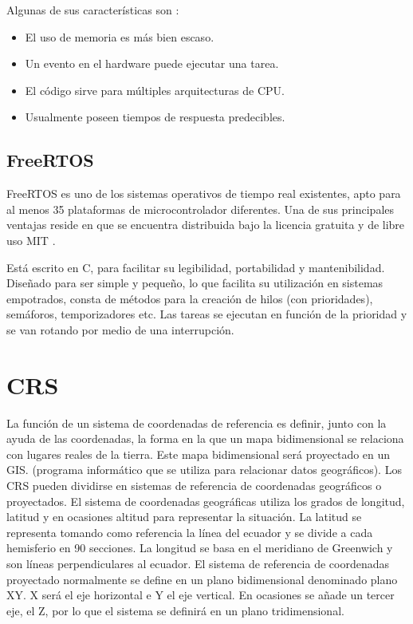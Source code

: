 Algunas de sus características son \cite{tiemporeal_c}:
\begin{itemize}
\tightlist
\item
	El uso de memoria es más bien escaso.
\item
	Un evento en el hardware puede ejecutar una tarea.
\item
	El código sirve para múltiples arquitecturas de CPU.
\item
	Usualmente poseen tiempos de respuesta predecibles.
\end{itemize}

\subsection{FreeRTOS}
FreeRTOS \cite{FreeRTOS} es uno de los sistemas operativos de tiempo real existentes, apto para al menos 35 plataformas de microcontrolador diferentes. Una de sus principales ventajas reside en que se encuentra distribuida bajo la licencia gratuita y de libre uso MIT \cite{MIT}.

Está escrito en C, para facilitar su legibilidad, portabilidad y mantenibilidad. 
Diseñado para ser simple y pequeño, lo que facilita su utilización en sistemas empotrados, consta de métodos para la creación de hilos (con prioridades), semáforos, temporizadores etc. Las tareas se ejecutan en función de la prioridad y se van rotando por medio de una interrupción.

\section{CRS}
La función de un sistema de coordenadas de referencia\cite{crs} es definir, junto con la ayuda de las coordenadas, la forma en la que un mapa bidimensional se relaciona con lugares reales de la tierra. Este mapa bidimensional será proyectado en un GIS. (programa informático que se utiliza para relacionar datos geográficos).
Los CRS pueden dividirse en sistemas de referencia de coordenadas geográficos o proyectados.
El sistema de coordenadas geográficas utiliza los grados de longitud, latitud y en ocasiones altitud para representar la situación.
La latitud se representa tomando como referencia la línea del ecuador y se divide a cada hemisferio en 90 secciones.
La longitud se basa en el meridiano de Greenwich y son líneas perpendiculares al ecuador.
El sistema de referencia de coordenadas proyectado normalmente se define en un plano bidimensional denominado plano XY. X será el eje horizontal e Y el eje vertical. 
En ocasiones se añade un tercer eje, el Z, por lo que el sistema se definirá en un plano tridimensional.

